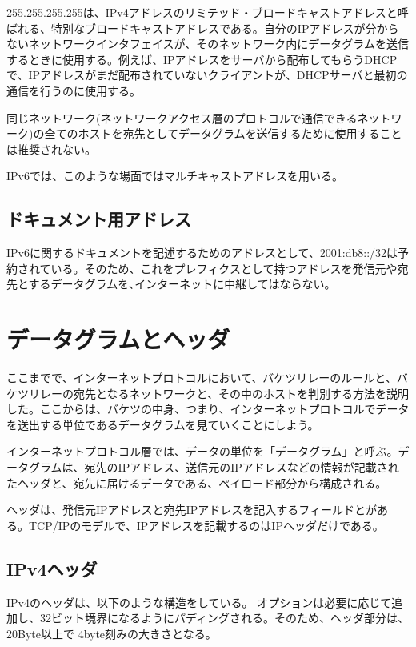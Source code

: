 255.255.255.255は、IPv4アドレスのリミテッド・ブロードキャストアドレスと呼ばれる、特別なブロードキャストアドレスである。自分のIPアドレスが分からないネットワークインタフェイスが、そのネットワーク内にデータグラムを送信するときに使用する。例えば、IPアドレスをサーバから配布してもらうDHCPで、IPアドレスがまだ配布されていないクライアントが、DHCPサーバと最初の通信を行うのに使用する。

同じネットワーク(ネットワークアクセス層のプロトコルで通信できるネットワーク)の全てのホストを宛先としてデータグラムを送信するために使用することは推奨されない。

IPv6では、このような場面ではマルチキャストアドレスを用いる。


\subsection{ドキュメント用アドレス}
IPv6に関するドキュメントを記述するためのアドレスとして、2001:db8::/32は予約されている。そのため、これをプレフィクスとして持つアドレスを発信元や宛先とするデータグラムを､インターネットに中継してはならない。







\section{データグラムとヘッダ}

ここまでで、インターネットプロトコルにおいて、バケツリレーのルールと、バケツリレーの宛先となるネットワークと、その中のホストを判別する方法を説明した。ここからは、バケツの中身、つまり、インターネットプロトコルでデータを送出する単位であるデータグラムを見ていくことにしよう。

インターネットプロトコル層では、データの単位を「データグラム」と呼ぶ。データグラムは、宛先のIPアドレス、送信元のIPアドレスなどの情報が記載されたヘッダと、宛先に届けるデータである、ペイロード部分から構成される。

ヘッダは、発信元IPアドレスと宛先IPアドレスを記入するフィールドとがある。TCP/IPのモデルで、IPアドレスを記載するのはIPヘッダだけである。

\subsection{IPv4ヘッダ}
IPv4のヘッダは、以下のような構造をしている。
オプションは必要に応じて追加し、32ビット境界になるようにパディングされる。そのため、ヘッダ部分は、20Byte以上で 4byte刻みの大きさとなる。


